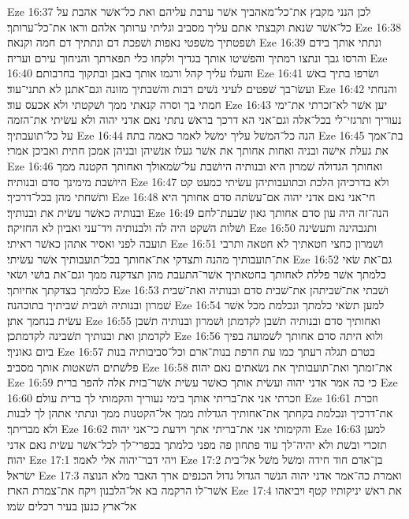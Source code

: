 Eze 16:37  לכן הנני מקבץ את־כל־מאהביך אשׁר ערבת עליהם ואת כל־אשׁר אהבת על כל־אשׁר שׂנאת וקבצתי אתם עליך מסביב וגליתי ערותך אלהם וראו את־כל־ערותך׃
Eze 16:38  ושׁפטתיך משׁפטי נאפות ושׁפכת דם ונתתיך דם חמה וקנאה׃
Eze 16:39  ונתתי אותך בידם והרסו גבך ונתצו רמתיך והפשׁיטו אותך בגדיך ולקחו כלי תפארתך והניחוך עירם ועריה׃
Eze 16:40  והעלו עליך קהל ורגמו אותך באבן ובתקוך בחרבותם׃
Eze 16:41  ושׂרפו בתיך באשׁ ועשׂו־בך שׁפטים לעיני נשׁים רבות והשׁבתיך מזונה וגם־אתנן לא תתני־עוד׃
Eze 16:42  והנחתי חמתי בך וסרה קנאתי ממך ושׁקטתי ולא אכעס עוד׃
Eze 16:43  יען אשׁר לא־זכרתי את־ימי נעוריך ותרגזי־לי בכל־אלה וגם־אני הא דרכך בראשׁ נתתי נאם אדני יהוה ולא עשׂיתי את־הזמה על כל־תועבתיך׃
Eze 16:44  הנה כל־המשׁל עליך ימשׁל לאמר כאמה בתה׃
Eze 16:45  בת־אמך את געלת אישׁה ובניה ואחות אחותך את אשׁר געלו אנשׁיהן ובניהן אמכן חתית ואביכן אמרי׃
Eze 16:46  ואחותך הגדולה שׁמרון היא ובנותיה היושׁבת על־שׂמאולך ואחותך הקטנה ממך היושׁבת מימינך סדם ובנותיה׃
Eze 16:47  ולא בדרכיהן הלכת ובתועבותיהן עשׂיתי כמעט קט ותשׁחתי מהן בכל־דרכיך׃
Eze 16:48  חי־אני נאם אדני יהוה אם־עשׂתה סדם אחותך היא ובנותיה כאשׁר עשׂית את ובנותיך׃
Eze 16:49  הנה־זה היה עון סדם אחותך גאון שׂבעת־לחם ושׁלות השׁקט היה לה ולבנותיה ויד־עני ואביון לא החזיקה׃
Eze 16:50  ותגבהינה ותעשׂינה תועבה לפני ואסיר אתהן כאשׁר ראיתי׃
Eze 16:51  ושׁמרון כחצי חטאתיך לא חטאה ותרבי את־תועבותיך מהנה ותצדקי את־אחותך בכל־תועבותיך אשׁר עשׂיתי׃
Eze 16:52  גם־את שׂאי כלמתך אשׁר פללת לאחותך בחטאתיך אשׁר־התעבת מהן תצדקנה ממך וגם־את בושׁי ושׂאי כלמתך בצדקתך אחיותך׃
Eze 16:53  ושׁבתי את־שׁביתהן את־שׁבית סדם ובנותיה ואת־שׁבית שׁמרון ובנותיה ושׁבית שׁביתיך בתוכהנה׃
Eze 16:54  למען תשׂאי כלמתך ונכלמת מכל אשׁר עשׂית בנחמך אתן׃
Eze 16:55  ואחותיך סדם ובנותיה תשׁבן לקדמתן ושׁמרון ובנותיה תשׁבן לקדמתן ואת ובנותיך תשׁבינה לקדמתכן׃
Eze 16:56  ולוא היתה סדם אחותך לשׁמועה בפיך ביום גאוניך׃
Eze 16:57  בטרם תגלה רעתך כמו עת חרפת בנות־ארם וכל־סביבותיה בנות פלשׁתים השׁאטות אותך מסביב׃
Eze 16:58  את־זמתך ואת־תועבותיך את נשׂאתים נאם יהוה׃
Eze 16:59  כי כה אמר אדני יהוה ועשׂית אותך כאשׁר עשׂית אשׁר־בזית אלה להפר ברית׃
Eze 16:60  וזכרתי אני את־בריתי אותך בימי נעוריך והקמותי לך ברית עולם׃
Eze 16:61  וזכרת את־דרכיך ונכלמת בקחתך את־אחותיך הגדלות ממך אל־הקטנות ממך ונתתי אתהן לך לבנות ולא מבריתך׃
Eze 16:62  והקימותי אני את־בריתי אתך וידעת כי־אני יהוה׃
Eze 16:63  למען תזכרי ובשׁת ולא יהיה־לך עוד פתחון פה מפני כלמתך בכפרי־לך לכל־אשׁר עשׂית נאם אדני יהוה׃
Eze 17:1  ויהי דבר־יהוה אלי לאמר׃
Eze 17:2  בן־אדם חוד חידה ומשׁל משׁל אל־בית ישׂראל׃
Eze 17:3  ואמרת כה־אמר אדני יהוה הנשׁר הגדול גדול הכנפים ארך האבר מלא הנוצה אשׁר־לו הרקמה בא אל־הלבנון ויקח את־צמרת הארז׃
Eze 17:4  את ראשׁ יניקותיו קטף ויביאהו אל־ארץ כנען בעיר רכלים שׂמו׃
